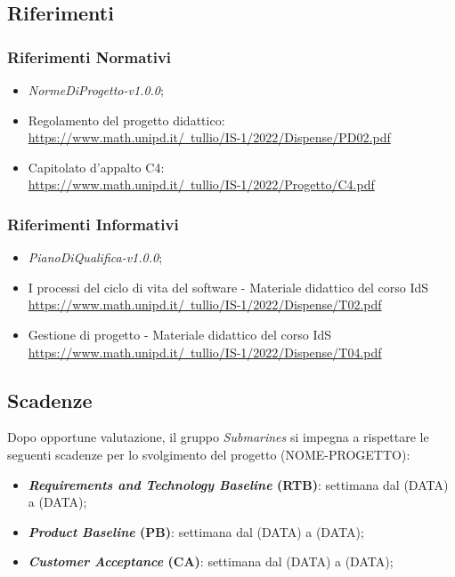 \documentclass[12pt, a4paper]{article}
\begin{document}
    \subsection{Riferimenti}
    \subsubsection{Riferimenti Normativi} %
    \begin{itemize}
        \item \emph{NormeDiProgetto-v1.0.0};
        \item Regolamento del progetto didattico: \\ \href{https://www.math.unipd.it/~tullio/IS-1/2022/Dispense/PD02.pdf}{\color{blue}https://www.math.unipd.it/~tullio/IS-1/2022/Dispense/PD02.pdf}
        \item Capitolato d'appalto C4: \\ \href{https://www.math.unipd.it/~tullio/IS-1/2022/Progetto/C4.pdf}{\color{blue}https://www.math.unipd.it/~tullio/IS-1/2022/Progetto/C4.pdf}
    \end{itemize}

    \subsubsection{Riferimenti Informativi} %
    \begin{itemize}
        \item \emph{PianoDiQualifica-v1.0.0};
        \item I processi del ciclo di vita del software - Materiale didattico del corso IdS \\ \href{https://www.math.unipd.it/~tullio/IS-1/2022/Dispense/T02.pdf}{\color{blue}https://www.math.unipd.it/~tullio/IS-1/2022/Dispense/T02.pdf}
        \item Gestione di progetto - Materiale didattico del corso IdS \\ \href{https://www.math.unipd.it/~tullio/IS-1/2022/Dispense/T04.pdf}{\color{blue}https://www.math.unipd.it/~tullio/IS-1/2022/Dispense/T04.pdf}
    \end{itemize}
    
    \subsection{Scadenze}
    Dopo opportune valutazione, il gruppo \emph{Submarines} si impegna a rispettare le seguenti scadenze per lo svolgimento del progetto (NOME-PROGETTO):
    \begin{itemize}
        \item \textbf{\emph{Requirements and Technology Baseline} (RTB)}: settimana dal (DATA) a (DATA);
        \item \textbf{\emph{Product Baseline} (PB)}: settimana dal (DATA) a (DATA);
        \item \textbf{\emph{Customer Acceptance} (CA)}: settimana dal (DATA) a (DATA);
    \end{itemize}
\end{document}
